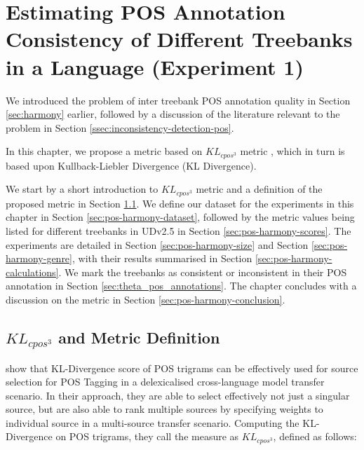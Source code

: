 \chapter{Estimating POS Annotation Consistency of Different Treebanks in a Language (Experiment 1)}
\label{chap:pos-harmony}

We introduced the problem of inter treebank POS annotation quality in Section \ref{sec:harmony} earlier, followed by a discussion of the literature relevant to the problem in Section \ref{ssec:inconsistency-detection-pos}. 

In this chapter, we propose a metric based on $KL_{cpos^3}$ metric \citep{klcpos3}, which in turn is based upon Kullback-Liebler Divergence (KL Divergence). 

We start by a short introduction to $KL_{cpos^3}$ metric and a definition of the proposed metric in Section \ref{sec:pos-harmony-definition}. We define our dataset for the experiments in this chapter in Section \ref{sec:pos-harmony-dataset}, followed by the metric values being listed for different treebanks in UDv2.5 \citep{UDv2.5} in Section \ref{sec:pos-harmony-scores}. The experiments are detailed in Section \ref{sec:pos-harmony-size} and Section \ref{sec:pos-harmony-genre}, with their results summarised in Section \ref{sec:pos-harmony-calculations}. We mark the treebanks as consistent or inconsistent in their POS annotation in Section \ref{sec:theta_pos_annotations}. The chapter concludes with a discussion on the metric in Section \ref{sec:pos-harmony-conclusion}.

\section{\texorpdfstring{$KL_{cpos^3}$}{KLcpos3} and Metric Definition}
\label{sec:pos-harmony-definition}

\cite{klcpos3} show that KL-Divergence score of POS trigrams can be effectively used for source selection for POS Tagging in a delexicalised cross-language model transfer scenario. In their approach, they are able to select effectively not just a singular source, but are also able to rank multiple sources by specifying weights to individual source in a multi-source transfer scenario. Computing the KL-Divergence on POS trigrams, they call the measure as $KL_{cpos^3}$, defined as follows:

